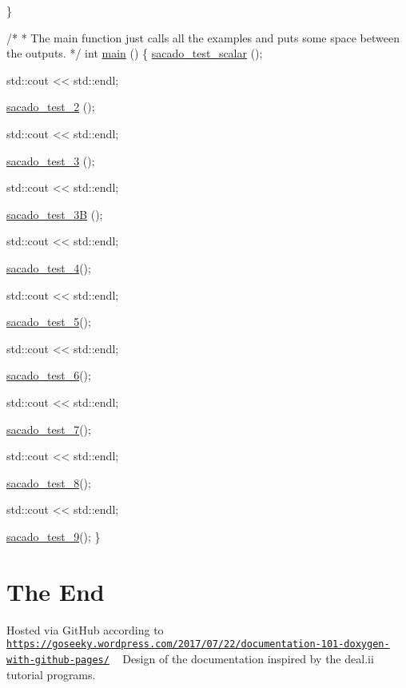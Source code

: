 \begin{DoxyCode}
\}
 
 
\textcolor{comment}{/*}
\textcolor{comment}{ * The main function just calls all the examples and puts some space between the outputs.}
\textcolor{comment}{ */}
\textcolor{keywordtype}{int} \hyperlink{Sacado__example_8cc_ae66f6b31b5ad750f1fe042a706a4e3d4}{main} ()
\{
    \hyperlink{Sacado__example_8cc_a71b2675e62203edc430e7ffc8a365193}{sacado\_test\_scalar} ();
 
    std::cout << std::endl;
 
    \hyperlink{Sacado__example_8cc_a8ef4ff1e9526ca8451cdcd1678366d2c}{sacado\_test\_2} ();
 
    std::cout << std::endl;
 
    \hyperlink{Sacado__example_8cc_ae45e1df0eec246dbb6f2c3d28a2a58e4}{sacado\_test\_3} ();
 
    std::cout << std::endl;
 
    \hyperlink{Sacado__example_8cc_ae63cc8526935cb0512668e83cfc7b929}{sacado\_test\_3B} ();
 
    std::cout << std::endl;
 
    \hyperlink{Sacado__example_8cc_a2f4def4563e31d720e07bc7d6363ebe2}{sacado\_test\_4}();
 
    std::cout << std::endl;
 
    \hyperlink{Sacado__example_8cc_a327dbbb4ea7fc9840c46d149843a44c2}{sacado\_test\_5}();
 
    std::cout << std::endl;
 
    \hyperlink{Sacado__example_8cc_a27450ab52a9d4250e3f5a5f2a3f8f317}{sacado\_test\_6}();
 
    std::cout << std::endl;
 
    \hyperlink{Sacado__example_8cc_a0b694459e5e15c1578d97e637faba8de}{sacado\_test\_7}();
 
    std::cout << std::endl;
 
    \hyperlink{Sacado__example_8cc_aa7108ff8393b98d66dfef50899d048d9}{sacado\_test\_8}();
 
    std::cout << std::endl;
 
    \hyperlink{Sacado__example_8cc_ae176f83fe1943e102fe325d4a14f097e}{sacado\_test\_9}();
\}
\end{DoxyCode}
\hypertarget{index_END}{}\section{The End}\label{index_END}
Hosted via Git\+Hub according to \href{https://goseeky.wordpress.com/2017/07/22/documentation-101-doxygen-with-github-pages/}{\tt https\+://goseeky.\+wordpress.\+com/2017/07/22/documentation-\/101-\/doxygen-\/with-\/github-\/pages/} ~\newline
Design of the documentation inspired by the deal.\+ii tutorial programs. 